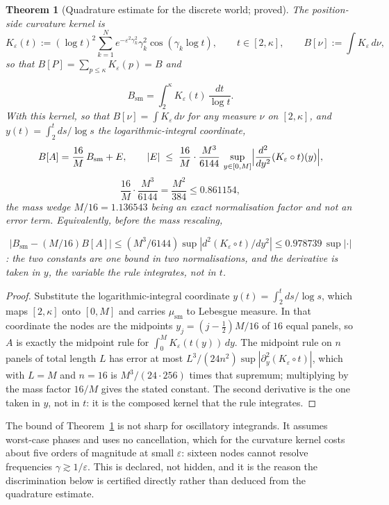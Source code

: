 \documentclass[11pt]{article}
\newtheorem{theorem}{Theorem}[section]
\newcommand{\Bsm}{B_{\mathrm{sm}}}              %
\begin{document}
\begin{theorem}[Quadrature estimate for the discrete world; proved]
\label{thm:quad}
The position-side curvature kernel is
\[
K_\varepsilon(t):=(\log t)^2\sum_{k=1}^{N}e^{-\varepsilon^2\gamma_k^2}
\gamma_k^2\cos(\gamma_k\log t),\qquad t\in[2,\kappa],
\qquad B[\nu]:=\int K_\varepsilon\,d\nu,
\]
so that $B[P]=\sum_{p\le\kappa}K_\varepsilon(p)=B$ and

\[
\Bsm=\int_2^{\kappa}K_\varepsilon(t)\,\frac{dt}{\log t}.
\]
 With this
kernel, so that
$B[\nu]=\int K_\varepsilon\,d\nu$ for any measure $\nu$ on $[2,\kappa]$, and
$y(t)=\int_2^t ds/\log s$ the logarithmic-integral coordinate,
\[
B[A]=\frac{16}{M}\,\Bsm+E,
\qquad
|E|\;\le\;\frac{16}{M}\cdot\frac{M^3}{6144}\,
\sup_{y\in[0,M]}\Bigl|\frac{d^2}{dy^2}(K_\varepsilon\circ t)(y)\Bigr| ,
\]
\[
\frac{16}{M}\cdot\frac{M^3}{6144}
=\frac{M^2}{384}
\le 0.861154 ,
\]
the mass wedge $M/16=1.136543$ being an exact normalisation factor and not an
error term. Equivalently, before the mass rescaling,

\[
|\Bsm-(M/16)B[A]|\le(M^3/6144)\sup|d^2(K_\varepsilon\circ t)/dy^2|
\le 0.978739\,\sup|\cdot|
\]
: the two constants are one bound in two
normalisations, and the derivative is taken in $y$, the variable the rule
integrates, not in $t$.
\end{theorem}

\begin{proof}
Substitute the logarithmic-integral coordinate
$y(t)=\int_2^t ds/\log s$, which maps $[2,\kappa]$ onto $[0,M]$ and carries
$\mu_{\mathrm{sm}}$ to Lebesgue measure. In that coordinate the nodes are the
midpoints $y_j=(j-\tfrac12)M/16$ of $16$ equal panels, so $A$ is exactly the
midpoint rule for $\int_0^M K_\varepsilon(t(y))\,dy$. The midpoint rule on $n$
panels of total length $L$ has error at most
$L^3/(24n^2)\sup|\partial_y^2(K_\varepsilon\circ t)|$, which with $L=M$ and
$n=16$ is $M^3/(24\cdot256)$ times that supremum; multiplying by the mass factor
$16/M$ gives the stated constant. The second derivative is the one taken in
$y$, not in $t$: it is the composed kernel that the rule integrates.
\end{proof}

The bound of Theorem~\ref{thm:quad} is not sharp for oscillatory integrands.
It assumes worst-case phases and uses no cancellation, which for the curvature
kernel costs about five orders of magnitude at small $\varepsilon$: sixteen
nodes cannot resolve frequencies $\gamma\gtrsim 1/\varepsilon$. This is
declared, not hidden, and it is the reason the discrimination below is
certified directly rather than deduced from the quadrature estimate.
\end{document}

